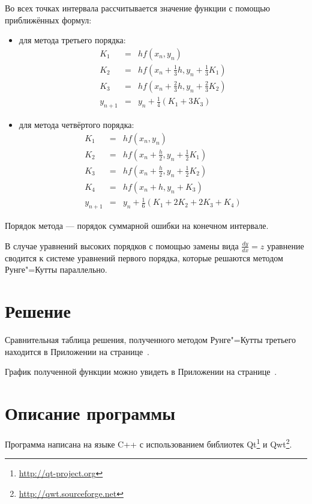 \documentclass[a4paper,12pt,notitlepage,headsepline,pdftex]{scrartcl}
\begin{document}
  Во всех точках интервала рассчитывается значение функции с помощью
  приближённых формул:
  \begin{itemize}
    \item для метода третьего порядка:
      \begin{eqnarray}
        K_1 &=& h f\left( x_n, y_n \right)\\
        K_2 &=& h f\left( x_n + \frac{1}{3}h, y_n + \frac{1}{3}K_1 \right)\\
        K_3 &=& h f\left( x_n + \frac{2}{3}h, y_n + \frac{2}{3}K_2 \right)\\
        y_{n+1} &=&  y_n + \frac{1}{4}\left( K_1 + 3 K_3 \right)
        \label{eq:rk3}
      \end{eqnarray}
    \item для метода четвёртого порядка:
      \begin{eqnarray}
        K_1 &=&  h f\left( x_n, y_n \right)\\
        K_2 &=&  h f\left( x_n + \frac{h}{2}, y_n + \frac{1}{2}K_1 \right)\\
        K_3 &=&  h f\left( x_n + \frac{h}{2}, y_n + \frac{1}{2}K_2 \right)\\
        K_4 &=&  h f\left( x_n + h, y_n + K_3 \right)\\
        y_{n+1} &=&  y_n + \frac{1}{6}\left( K_1 + 2 K_2 + 2 K_3 + K_4 \right)
        \label{eq:rk4}
      \end{eqnarray}
  \end{itemize}

  Порядок метода --- порядок суммарной ошибки на конечном интервале.

  В случае уравнений высоких порядков с помощью замены вида
  $\frac{dy}{dx} = z$ уравнение сводится к системе уравнений первого порядка,
  которые решаются методом Рунге"=Кутты параллельно.
  \newpage
\section{Решение}
    Сравнительная таблица решения, полученного методом Рунге"=Кутты третьего
    находится в Приложении на странице~\pageref{tab:fxs}.

    График полученной функции можно увидеть в Приложении на
    странице~\pageref{fig:gui}.
\section{Описание программы}
  Программа написана на языке C++ с использованием библиотек
  Qt\footnote{\url{http://qt-project.org}} и
  Qwt\footnote{\url{http://qwt.sourceforge.net}}.
\end{document}
